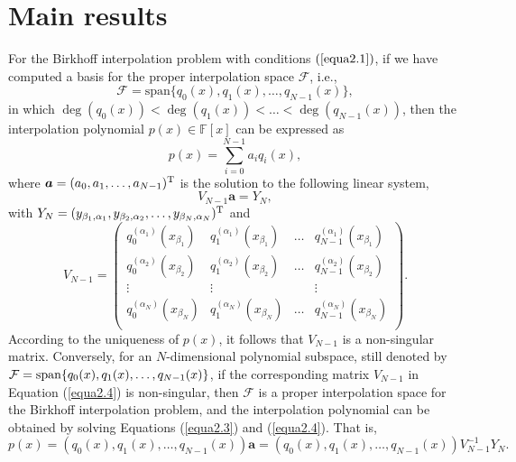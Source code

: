 \documentclass[preprint,12pt]{elsarticle}
\begin{document}
\section{Main results}


For the Birkhoff interpolation problem with conditions $(\ref{equa2.1})$, if we have computed a basis for the proper interpolation space $\mathcal{F}$, i.e.,
$$\mathcal{F}=\text{span}\{q_0(x), q_1(x), \dots, q_{N-1}(x) \},$$
in which 
$\deg(q_0(x))<\deg(q_1(x))<\dots<\deg(q_{N-1}(x))$, then the interpolation polynomial $p(x)\in \mathbb{F}[x]$ can be expressed as
\begin{equation*}\label{equa2.2}
p(x)=\sum_{i=0}^{N-1}a_iq_i(x),
\end{equation*}
where  $\boldsymbol{a} =(a_0 ,a_1, \dots,a_{N-1})^\textup{T} $ is the solution to the following linear system,
\begin{equation}\label{equa2.3}
V_{N-1}\boldsymbol{a} =Y_N,
\end{equation}
with $Y_N=(y_{\beta_1,\alpha_1},y_{\beta_2,\alpha_2},\dots,y_{\beta_N,\alpha_N})^\textup{T}$ and
\begin{equation}\label{equa2.4}
V_{N-1}=\left(
                \begin{array}{ccccc}
                  q_0^{(\alpha_1)}(x_{\beta_1}) & q_1^{(\alpha_1)}(x_{\beta_1}) & \dots & q_{N-1}^{(\alpha_1)}(x_{\beta_1}) \\
                  q_0^{(\alpha_2)}(x_{\beta_2}) & q_1^{(\alpha_2)}(x_{\beta_2}) & \dots & q_{N-1}^{(\alpha_2)}(x_{\beta_2}) \\
                  \vdots & \vdots & ~& \vdots  \\
                  q_0^{(\alpha_N)}(x_{\beta_N}) & q_1^{(\alpha_N)}(x_{\beta_N}) & \dots & q_{N-1}^{(\alpha_N)}(x_{\beta_N}) \\
                \end{array}
              \right).
\end{equation}
According to the uniqueness of $p(x)$, it follows that $V_{N-1}$ is a non-singular matrix. Conversely, for an $N$-dimensional polynomial subspace, still denoted by $\mathcal{F}=\textup{span}\{q_0(x),q_1(x),\dots,q_{N-1}(x)\}$, if  the corresponding matrix $V_{N-1}$ in Equation (\ref{equa2.4}) is non-singular, then $\mathcal{F}$ is a  proper interpolation space for the Birkhoff interpolation problem, and the interpolation polynomial can be obtained by solving Equations (\ref{equa2.3}) and (\ref{equa2.4}). That is,
\begin{equation*}%
p(x)=(q_0(x),q_1(x),\dots,q_{N-1}(x))\boldsymbol{a}=(q_0(x),q_1(x),\dots,q_{N-1}(x))V_{N-1}^{-1}Y_N.
\end{equation*}
\end{document}
